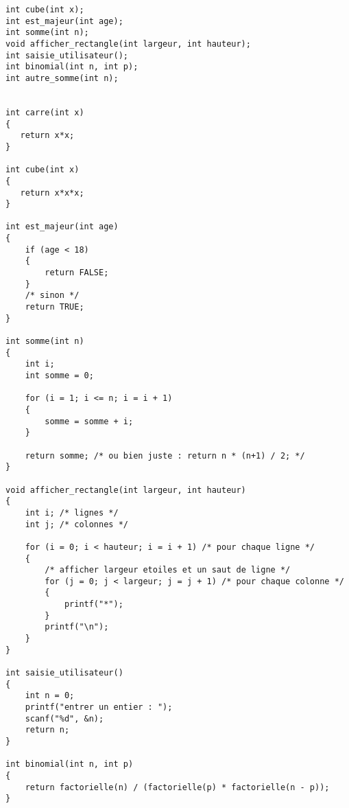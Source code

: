 \begin{correction}
\begin{verbatim}
int cube(int x);
int est_majeur(int age);
int somme(int n);
void afficher_rectangle(int largeur, int hauteur);
int saisie_utilisateur();
int binomial(int n, int p);
int autre_somme(int n);


int carre(int x)
{
   return x*x;
}

int cube(int x)
{
   return x*x*x;
}

int est_majeur(int age)
{
    if (age < 18)
    {
        return FALSE;
    }
    /* sinon */
    return TRUE;
}

int somme(int n)
{
    int i;
    int somme = 0;

    for (i = 1; i <= n; i = i + 1)
    {
        somme = somme + i;
    }

    return somme; /* ou bien juste : return n * (n+1) / 2; */
}

void afficher_rectangle(int largeur, int hauteur)
{
    int i; /* lignes */
    int j; /* colonnes */

    for (i = 0; i < hauteur; i = i + 1) /* pour chaque ligne */
    {
        /* afficher largeur etoiles et un saut de ligne */
        for (j = 0; j < largeur; j = j + 1) /* pour chaque colonne */
        {
            printf("*");
        }
        printf("\n");
    }
}

int saisie_utilisateur()
{
    int n = 0;
    printf("entrer un entier : ");
    scanf("%d", &n);
    return n;
}

int binomial(int n, int p)
{
    return factorielle(n) / (factorielle(p) * factorielle(n - p));
}
\end{verbatim}
\end{correction}


